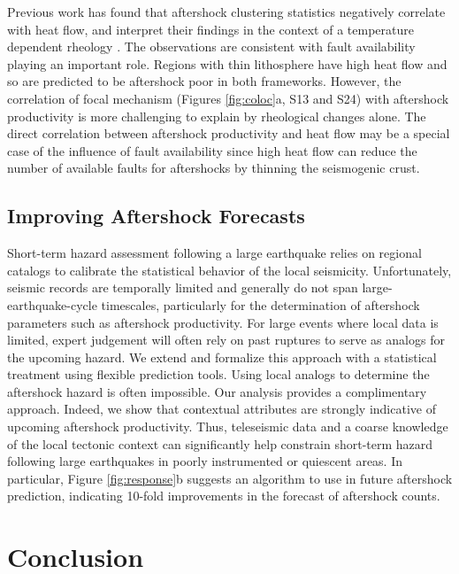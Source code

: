 \documentclass[draft, jgrga]{agujournal2018}
\begin{document}
Previous work has found that aftershock clustering statistics negatively correlate with heat flow, and interpret their findings in the context of a temperature dependent rheology \citep{Ben-Zion2006AnalysisRheology, Zaliapin2016AClusters}. The observations are consistent with fault availability playing an important role. Regions with thin lithosphere have high heat flow and so are predicted to be aftershock poor in both frameworks. However, the correlation of focal mechanism (Figures \ref{fig:coloc}a, S13 and S24) with aftershock productivity is more challenging to explain by rheological changes alone. The direct correlation between aftershock productivity and heat flow may be a special case of the influence of fault availability since high heat flow can reduce the number of available faults for aftershocks by thinning the seismogenic crust.

\subsection{Improving Aftershock Forecasts}

Short-term hazard assessment following a large earthquake relies on regional catalogs to calibrate the statistical behavior of the local seismicity. Unfortunately, seismic records are temporally limited and generally do not span large-earthquake-cycle timescales, particularly for the determination of aftershock parameters such as aftershock productivity. For large events where local data is limited, expert judgement will often rely on past ruptures to serve as analogs for the upcoming hazard. We extend and formalize this approach with a statistical treatment using flexible prediction tools. Using local analogs to determine the aftershock hazard is often impossible. Our analysis provides a complimentary approach. Indeed, we show that contextual attributes are strongly indicative of upcoming aftershock productivity. Thus, teleseismic data and a coarse knowledge of the local tectonic context can significantly help constrain short-term hazard following large earthquakes in poorly instrumented or quiescent areas. In particular, Figure \ref{fig:response}b suggests an algorithm to use in future aftershock prediction, indicating 10-fold improvements in the forecast of aftershock counts.

\section{Conclusion}
\end{document}
